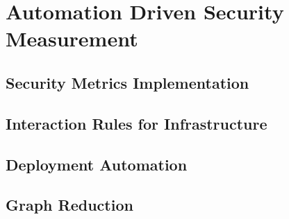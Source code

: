 
\chapter{Automation Driven Security Measurement} \label{ch:automation}



\section{Security Metrics Implementation}\label{sec:automation:secmet_impl}



\section{Interaction Rules for Infrastructure}\label{sec:automation:infra}



\section{Deployment Automation}\label{sec:automation:deploy}



\section{Graph Reduction}\label{sec:automation:gen_trans_matrix}



